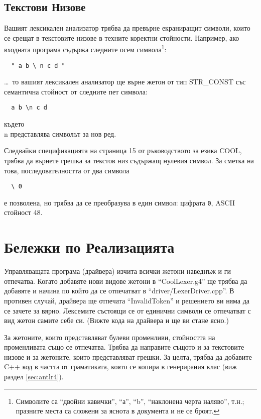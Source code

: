 \documentclass[11pt]{article}
\begin{document}
\subsection{Текстови Низове}

Вашият лексикален анализатор трябва да превърне екраниращит символи, които се срещат в текстовите низове в техните коректни стойности.
Например, ако входната програма съдържа следните осем символа\footnote{Символите са ``двойни кавички'', ``а'', ``b'', ``наклонена черта наляво'', т.н.; празните места са сложени за яснота в документа и не се броят.}:

\begin{verbatim}
  " a b \ n c d "
\end{verbatim}

\noindent \ldots\ то вашият лексикален анализатор ще върне жетон от тип STR\_CONST със семантична стойност от следните пет символа:

\begin{verbatim}
  a b \n c d
\end{verbatim}

\noindent където \\n представлява символът за нов ред.

Следвайки спецификацията на страница 15 от ръководството за езика COOL, трябва да върнете грешка за текстов низ съдържащ нулевия символ.
За сметка на това, последователността от два символа

\begin{verbatim}
  \ 0
\end{verbatim}

\noindent е позволена, но трябва да се преобразува в един символ: цифрата \texttt{0}, ASCII стойност 48.

\section{Бележки по Реализацията}

Управляващата програма (драйвера) изчита всички жетони наведнъж и ги отпечатва.
Когато добавяте нови видове жетони в ``CoolLexer.g4'' ще трябва да добавяте и начина по който да се отпечатват в ``driver/LexerDriver.cpp''.
В противен случай, драйвера ще отпечата ``InvalidToken'' и решението ви няма да се зачете за вярно.
Лексемите състоящи се от единични символи се отпечатват с вид жетон самите себе си.
(Вижте кода на драйвера и ще ви стане ясно.)

За жетоните, които представляват булеви променливи, стойността на променливата също се отпечатва.
Трябва да направите същото и за текстовите низове и за жетоните, които представляват грешки.
За целта, трябва да добавите C++ код в частта от граматиката, която се копира в генерирания клас (виж раздел \ref{sec:antlr4}).
\end{document}
